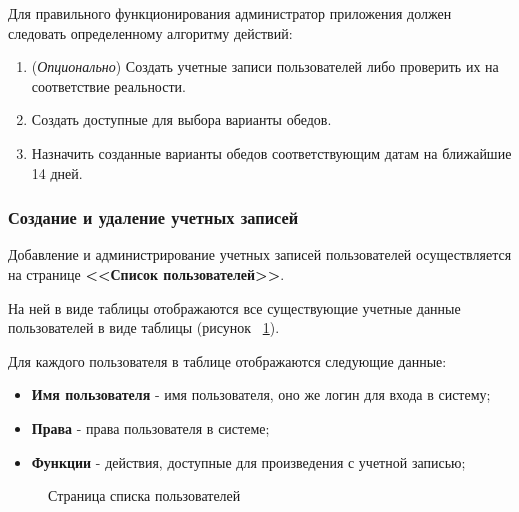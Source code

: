 \documentclass[a4paper]{article}
\begin{document}
Для правильного функционирования администратор приложения должен следовать определенному алгоритму действий:

\begin{enumerate}
\setlength{\itemsep}{-2mm}
	\item (\textit{Опционально}) Создать учетные записи пользователей либо проверить их на соответствие реальности. 
	\item Создать доступные для выбора варианты обедов.
	\item Назначить созданные варианты обедов соответствующим датам на ближайшие 14 дней.
\end{enumerate}

\subsubsection{Создание и удаление учетных записей}

Добавление и администрирование учетных записей пользователей осуществляется на странице \textbf{<<Список пользователей>>}.

На ней в виде таблицы отображаются все существующие учетные данные пользователей в виде таблицы (рисунок ~\ref{fig:image5}). 

Для каждого пользователя в таблице отображаются следующие данные:

\begin{itemize}
\setlength{\itemsep}{-2mm}
	\item \textbf{Имя пользователя} - имя пользователя, оно же логин для входа в систему;
	\item \textbf{Права} - права пользователя в системе;
	\item \textbf{Функции} - действия, доступные для произведения с учетной записью;  
\end{itemize}

\begin{figure}[h]
\caption{Страница списка пользователей}
\label{fig:image5}
\end{figure}
\end{document}

